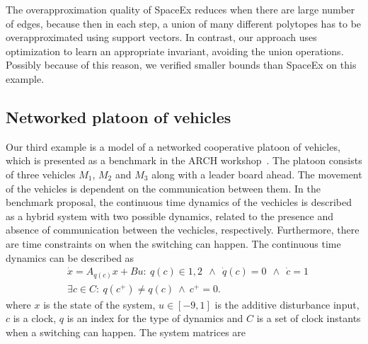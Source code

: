   The overapproximation quality of SpaceEx reduces when
there are large number of edges, because then in each step, a union of
many different polytopes has to be overapproximated using support
vectors.  In contrast, our approach uses optimization to learn an
appropriate invariant, avoiding the union operations.  Possibly
because of this reason, we verified smaller bounds than SpaceEx on
this example.


\subsection{Networked platoon of vehicles}
Our third example is a model of a networked cooperative platoon of
vehicles, which is presented as a benchmark in the ARCH
workshop~\cite{makhlouf2014networked}.  The platoon consists of three
vehicles $M_1$, $M_2$ and $M_3$ along with a leader board ahead.  The
movement of the vehicles is dependent on the communication between
them.  In the benchmark proposal, the continuous time dynamics of the
vechicles is described as a hybrid system with two possible dynamics,
related to the presence and absence of communication between the
vechicles, respectively.  Furthermore, there are time constraints on
when the switching can happen.  The continuous time dynamics can be
described as 
 \begin{align*} &\dot{x} = A_{q(c)}x+B
u:~q(c)\in{1,2}~~\wedge~~\dot{q}(c)=0~~\wedge~~\dot{c}=1\\ &\exists
c\in C:~q(c^+)\neq q(c)~\wedge~c^+=0.
\end{align*}
%
where $x$ is the state of the system, $u\in[-9,1]$ is the additive
disturbance input, $c$ is a clock, $q$ is an index
for the type of dynamics and $C$ is a set of clock instants when a
switching can happen.  The system matrices are 
%
